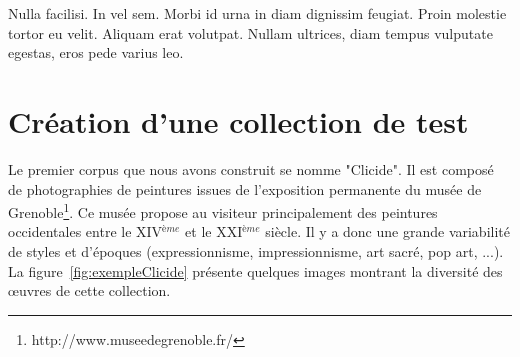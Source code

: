 \begin{savequote}[75mm] 
Nulla facilisi. In vel sem. Morbi id urna in diam dignissim feugiat. Proin molestie tortor eu velit. Aliquam erat volutpat. Nullam ultrices, diam tempus vulputate egestas, eros pede varius leo.
\end{savequote}



\section{Création d'une collection de test}

Le premier corpus que nous avons construit se nomme "Clicide". Il est composé de photographies de peintures issues de l'exposition permanente du musée de Grenoble\footnote{http://www.museedegrenoble.fr/}. Ce musée propose au visiteur principalement des peintures occidentales entre le XIV$^{\text{\`e}me}$ et le XXI$^{\text{\`e}me}$ siècle. Il y a donc une grande variabilité de styles et d'époques (expressionnisme, impressionnisme, art sacré, pop art, ...). La figure~\ref{fig:exempleClicide} présente quelques images montrant la diversité des œuvres de cette collection.

